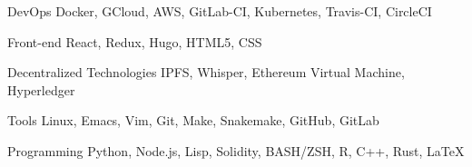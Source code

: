 
\begin{cvskills}

	\cvskill
	{DevOps} %
	{Docker, GCloud, AWS, GitLab-CI, Kubernetes, Travis-CI, CircleCI} %

	\cvskill
	{Front-end} %
	{React, Redux, Hugo, HTML5, CSS} %

	\cvskill
	{Decentralized Technologies} %
	{IPFS, Whisper, Ethereum Virtual Machine, Hyperledger} %

	\cvskill
	{Tools} %
	{Linux, Emacs, Vim, Git, Make, Snakemake,  GitHub, GitLab} %

	\cvskill
	{Programming} %
	{Python, Node.js, Lisp, Solidity, BASH/ZSH, R, C++, Rust, LaTeX} %


\end{cvskills}
